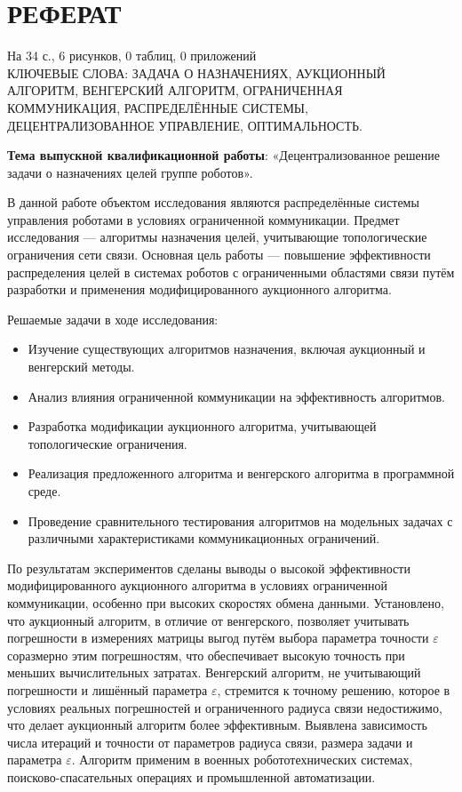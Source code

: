 \chapter*{РЕФЕРАТ}
\label{ch:abstract}

На 34 с., 6 рисунков, 0 таблиц, 0 приложений \\

КЛЮЧЕВЫЕ СЛОВА: ЗАДАЧА О НАЗНАЧЕНИЯХ, АУКЦИОННЫЙ АЛГОРИТМ, ВЕНГЕРСКИЙ АЛГОРИТМ, ОГРАНИЧЕННАЯ КОММУНИКАЦИЯ, РАСПРЕДЕЛЁННЫЕ СИСТЕМЫ, ДЕЦЕНТРАЛИЗОВАННОЕ УПРАВЛЕНИЕ, ОПТИМАЛЬНОСТЬ.

\textbf{Тема выпускной квалификационной работы}: «Децентрализованное решение задачи о назначениях целей группе роботов».

В данной работе объектом исследования являются распределённые системы управления роботами в условиях ограниченной коммуникации. Предмет исследования — алгоритмы назначения целей, учитывающие топологические ограничения сети связи. Основная цель работы — повышение эффективности распределения целей в системах роботов с ограниченными областями связи путём разработки и применения модифицированного аукционного алгоритма. 

Решаемые задачи в ходе исследования:
\begin{itemize}
	\item Изучение существующих алгоритмов назначения, включая аукционный и венгерский методы.
	\item Анализ влияния ограниченной коммуникации на эффективность алгоритмов.
	\item Разработка модификации аукционного алгоритма, учитывающей топологические ограничения.
	\item Реализация предложенного алгоритма и венгерского алгоритма в программной среде.
	\item Проведение сравнительного тестирования алгоритмов на модельных задачах с различными характеристиками коммуникационных ограничений.
\end{itemize}


По результатам экспериментов сделаны выводы о высокой эффективности модифицированного аукционного алгоритма в условиях ограниченной коммуникации, особенно при высоких скоростях обмена данными. Установлено, что аукционный алгоритм, в отличие от венгерского, позволяет учитывать погрешности в измерениях матрицы выгод путём выбора параметра точности $\varepsilon$ соразмерно этим погрешностям, что обеспечивает высокую точность при меньших вычислительных затратах. Венгерский алгоритм, не учитывающий погрешности и лишённый параметра $\varepsilon$, стремится к точному решению, которое в условиях реальных погрешностей и ограниченного радиуса связи недостижимо, что делает аукционный алгоритм более эффективным. Выявлена зависимость числа итераций и точности от параметров радиуса связи, размера задачи и параметра $\varepsilon$. Алгоритм применим в военных робототехнических системах, поисково-спасательных операциях и промышленной автоматизации.

